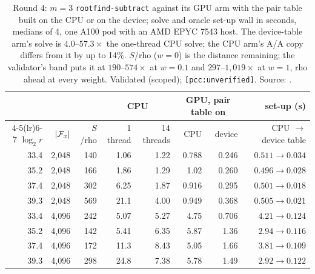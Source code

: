 \begin{table}[t]
\centering\small
\begin{tabular}{@{}rrrrrrrr@{}}
\toprule
& & & \multicolumn{2}{c}{CPU} & \multicolumn{2}{c}{GPU, pair table on} & set-up (s) \\
\cmidrule(lr){4-5}\cmidrule(lr){6-7}
$\log_2r$ & $\lvert \mathcal{F}_x \rvert$ & $S$/rho & 1 thread & 14 threads & CPU & device & CPU $\to$ device table \\
\midrule
33.4 & 2{,}048 & 140 & 1.06 & 1.22 & 0.788 & 0.246 & $0.511\to0.034$ \\
35.2 & 2{,}048 & 166 & 1.86 & 1.29 & 1.02 & 0.260 & $0.496\to0.028$ \\
37.4 & 2{,}048 & 302 & 6.25 & 1.87 & 0.916 & 0.295 & $0.501\to0.018$ \\
39.3 & 2{,}048 & 569 & 21.1 & 4.00 & 0.949 & 0.368 & $0.505\to0.021$ \\
33.4 & 4{,}096 & 242 & 5.07 & 5.27 & 4.75 & 0.706 & $4.21\to0.124$ \\
35.2 & 4{,}096 & 142 & 5.41 & 6.35 & 5.87 & 1.36 & $2.94\to0.116$ \\
37.4 & 4{,}096 & 172 & 11.3 & 8.43 & 5.05 & 1.66 & $3.81\to0.109$ \\
39.3 & 4{,}096 & 298 & 24.8 & 7.38 & 5.78 & 1.49 & $2.92\to0.122$ \\
\bottomrule
\end{tabular}
\caption[]{Round 4: $m=3$ \texttt{rootfind-subtract} against its GPU arm
with the pair table built on the CPU or on the device; solve and oracle
set-up wall in seconds, medians of 4, one A100 pod with an AMD EPYC 7543
host. The device-table arm's solve is $4.0$--$57.3\times$ the one-thread
CPU solve; the CPU arm's A/A copy differs from it by up to 14\%. $S$/rho
($w=0$) is the distance remaining; the validator's band puts it at
$190$--$574\times$ at $w=0.1$ and $297$--$1{,}019\times$ at $w=1$, rho ahead
at every weight. Validated (scoped); \texttt{[pcc:unverified]}. Source:
.}
\label{tab:rf-gpu-pairs}
\end{table}

